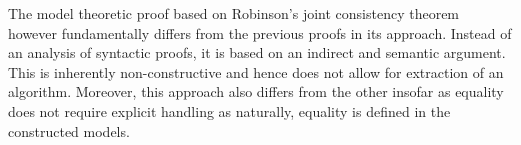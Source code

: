 The model theoretic proof based on Robinson's joint consistency theorem however fundamentally differs from the previous proofs in its approach.
Instead of an analysis of syntactic proofs, it is based on an indirect and semantic argument.
This is inherently non-constructive and hence does not allow for extraction of an algorithm.
Moreover, this approach also differs from the other insofar as equality does not require explicit handling
as naturally, equality is defined in the constructed models.







%
%
%
%
%
